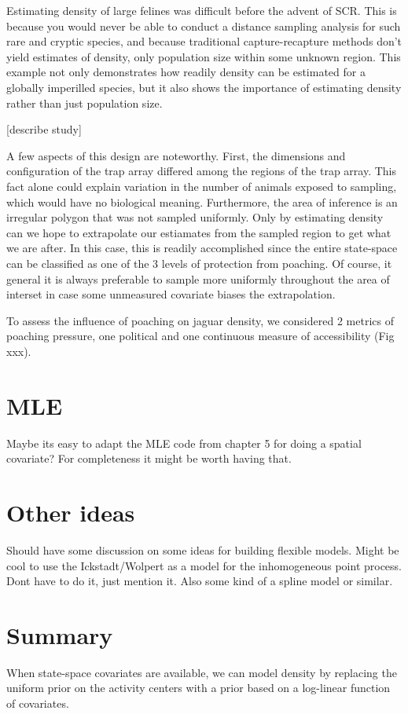 Estimating density of large felines was difficult before the advent of
SCR. This is because you would never be able to conduct a distance
sampling analysis for such rare and cryptic species, and because
traditional capture-recapture methods don't yield estimates of
density, only population size within some unknown region. This example
not only demonstrates how readily density can be estimated for a
globally imperilled species, but it also shows the importance of
estimating density rather than just population size. 

[describe study]

A few aspects of this design are noteworthy. First, the dimensions and
configuration of the trap array differed among the regions of the trap
array. This fact alone could explain variation in the number of
animals exposed to sampling, which would have no biological
meaning. Furthermore, the area of inference is an irregular polygon
that was not sampled uniformly. Only by estimating density can we hope
to extrapolate our estiamates from the sampled region to get what we
are after. In this case, this is readily accomplished since the entire
state-space can be classified as one of the 3 levels of protection
from poaching. Of course, it general it is always preferable to sample
more uniformly throughout the area of interset in case some unmeasured
covariate biases the extrapolation.

To assess the influence of poaching on jaguar density, we considered 2
metrics of poaching pressure, one political and one continuous measure
of accessibility (Fig xxx). 



\section{MLE}

Maybe its easy to adapt the MLE code from chapter 5 for doing a
spatial covariate? For completeness it might be worth having that.

\section{Other ideas}

Should have some discussion on some ideas for building flexible
models. Might be cool to use the Ickstadt/Wolpert as a model for the
inhomogeneous point process. Dont have to do it, just mention it. Also
some kind of a spline model or similar.




\section{Summary}

When state-space covariates are available, we can model
density by replacing the uniform prior on the activity centers with a
prior based on a log-linear function of covariates.




